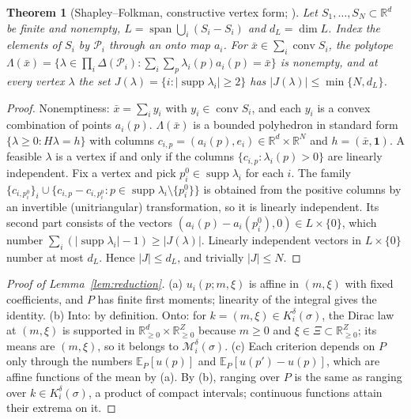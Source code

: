 \documentclass[preprint,12pt]{elsarticle}
\newtheorem{theorem}{Theorem}
\theoremstyle{definition}
\theoremstyle{remark}
\newcommand{\R}{\mathbb{R}}
\newcommand{\E}{\mathbb{E}}
\newcommand{\cP}{\mathcal{P}}
\newcommand{\cM}{\mathcal{M}}
\newcommand{\conv}{\operatorname{conv}}
\newcommand{\spn}{\operatorname{span}}
\newcommand{\supp}{\operatorname{supp}}
\begin{document}
\begin{theorem}[Shapley--Folkman, constructive vertex form; \citealp{Starr1969}]\label{thm:sf}
Let $S_1,\dots,S_N\subset\R^d$ be finite and nonempty, $L=\spn\bigcup_i(S_i-S_i)$ and $d_L=\dim L$. Index the elements of $S_i$ by $\cP_i$ through an onto map $a_i$. For $\bar x\in\sum_i\conv S_i$, the polytope $\Lambda(\bar x)=\{\lambda\in\prod_i\Delta(\cP_i):\sum_i\sum_p\lambda_i(p)a_i(p)=\bar x\}$ is nonempty, and at every vertex $\lambda$ the set $J(\lambda)=\{i:|\supp\lambda_i|\ge2\}$ has $|J(\lambda)|\le\min\{N,d_L\}$.
\end{theorem}
\begin{proof}
Nonemptiness: $\bar x=\sum_iy_i$ with $y_i\in\conv S_i$, and each $y_i$ is a convex combination of points $a_i(p)$. $\Lambda(\bar x)$ is a bounded polyhedron in standard form $\{\lambda\ge0:H\lambda=h\}$ with columns $c_{i,p}=(a_i(p),e_i)\in\R^d\times\R^N$ and $h=(\bar x,\mathbf 1)$. A feasible $\lambda$ is a vertex if and only if the columns $\{c_{i,p}:\lambda_i(p)>0\}$ are linearly independent. Fix a vertex and pick $p_i^0\in\supp\lambda_i$ for each $i$. The family $\{c_{i,p_i^0}\}_i\cup\{c_{i,p}-c_{i,p_i^0}:p\in\supp\lambda_i\setminus\{p_i^0\}\}$ is obtained from the positive columns by an invertible (unitriangular) transformation, so it is linearly independent. Its second part consists of the vectors $(a_i(p)-a_i(p_i^0),0)\in L\times\{0\}$, which number $\sum_i(|\supp\lambda_i|-1)\ge|J(\lambda)|$. Linearly independent vectors in $L\times\{0\}$ number at most $d_L$. Hence $|J|\le d_L$, and trivially $|J|\le N$.
\end{proof}

\begin{proof}[Proof of Lemma~\ref{lem:reduction}]
(a) $u_i(p;m,\xi)$ is affine in $(m,\xi)$ with fixed coefficients, and $P$ has finite first moments; linearity of the integral gives the identity. (b) Into: by definition. Onto: for $k=(m,\xi)\in K_i^\delta(\sigma)$, the Dirac law at $(m,\xi)$ is supported in $\R^d_{\ge0}\times\R^Z_{\ge0}$ because $m\ge0$ and $\xi\in\Xi\subset\R^Z_{\ge0}$; its means are $(m,\xi)$, so it belongs to $\cM_i^\delta(\sigma)$. (c) Each criterion depends on $P$ only through the numbers $\E_P[u(p)]$ and $\E_P[u(p')-u(p)]$, which are affine functions of the mean by (a). By (b), ranging over $P$ is the same as ranging over $k\in K_i^\delta(\sigma)$, a product of compact intervals; continuous functions attain their extrema on it.
\end{proof}
\end{document}
